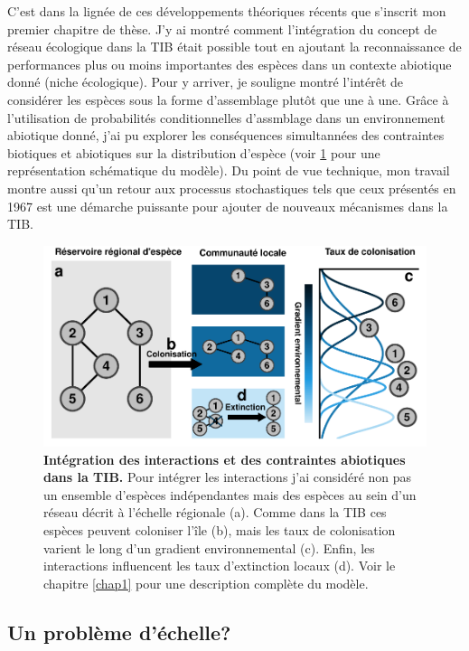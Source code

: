 C'est dans la lignée de ces développements théoriques récents que
s'inscrit mon premier chapitre de thèse. J'y ai montré comment
l'intégration du concept de réseau écologique dans la TIB était possible
tout en ajoutant la reconnaissance de performances plus ou moins
importantes des espèces dans un contexte abiotique donné (niche
écologique). Pour y arriver, je souligne montré l'intérêt de considérer
les espèces sous la forme d'assemblage plutôt que une à une. Grâce à
l'utilisation de probabilités conditionnelles d'assmblage dans un
environnement abiotique donné, j'ai pu explorer les conséquences
simultannées des contraintes biotiques et abiotiques sur la distribution
d'espèce (voir \ref{fig:figGTIB} pour une représentation schématique du
modèle). Du point de vue technique, mon travail montre aussi qu'un
retour aux processus stochastiques tels que ceux présentés en 1967 est
une démarche puissante pour ajouter de nouveaux mécanismes dans la TIB.

\begin{figure}[htbp]
\centering
\includegraphics{fig/fig2.pdf}
\caption{\textbf{Intégration des interactions et des contraintes
abiotiques dans la TIB.} Pour intégrer les interactions j'ai considéré
non pas un ensemble d'espèces indépendantes mais des espèces au sein
d'un réseau décrit à l'échelle régionale (a). Comme dans la TIB ces
espèces peuvent coloniser l'île (b), mais les taux de colonisation
varient le long d'un gradient environnemental (c). Enfin, les
interactions influencent les taux d'extinction locaux (d). Voir le
chapitre \ref{chap1} pour une description complète du
modèle.\label{fig:figGTIB}}
\end{figure}

\subsection*{Un problème d'échelle?}\label{un-probluxe8me-duxe9chelle}

